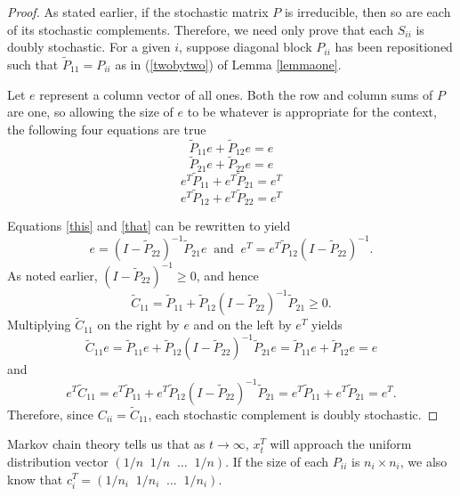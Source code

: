 \documentclass[final]{siamltex}
\begin{document}
\begin{proof}
As stated earlier, if the stochastic matrix $P$ is irreducible, then so are each of its stochastic complements. Therefore, we need only prove that each $S_{ii}$ is doubly stochastic. For a given $i$, suppose diagonal block $P_{ii}$ has been repositioned such that $\tilde{P}_{11}=P_{ii}$ as in  (\ref{twobytwo}) of Lemma \ref{lemmaone}.

Let $e$ represent a column vector of all ones. Both the row and column sums of $P$ are one, so allowing the size of $e$ to be whatever is appropriate for the context, the following four equations are true 
\begin{equation}
\tilde{P}_{11}e + \tilde{P}_{12}e = e 
\end{equation}
\begin{equation} \label{this}
\tilde{P}_{21}e + \tilde{P}_{22}e = e 
\end{equation}
\begin{equation}
e^{T}\tilde{P}_{11} + e^{T}\tilde{P}_{21} = e^{T} 
\end{equation}
\begin{equation} \label{that}
e^{T}\tilde{P}_{12} + e^{T}\tilde{P}_{22} = e^{T}
\end{equation}

Equations \ref{this} and \ref{that} can be rewritten to yield
$$
e = \left(I - \tilde{P}_{22} \right) ^{-1} \tilde{P}_{21}e \;\; \mbox{and} \;\; e^{T}=e^{T} \tilde{P}_{12} \left(I - \tilde{P}_{22} \right)^{-1}.
$$
As noted earlier, $(I - \tilde{P}_{22}) ^{-1} \ge 0$, and hence 
$$
\tilde{C}_{11}= \tilde{P}_{11}+\tilde{P}_{12} \left(I- \tilde{P}_{22}\right)^{-1}\tilde{P}_{21} \ge 0.
$$
Multiplying $\tilde{C}_{11}$ on the right by $e$ and on the left by $e^{T}$ yields
$$
\tilde{C}_{11}e= \tilde{P}_{11}e+\tilde{P}_{12} \left(I- \tilde{P}_{22}\right)^{-1}\tilde{P}_{21}e =
 \tilde{P}_{11}e+\tilde{P}_{12}e = e
$$ 
and
$$ 
e^{T}\tilde{C}_{11}= e^{T}\tilde{P}_{11}+e^{T}\tilde{P}_{12} \left(I- \tilde{P}_{22}\right)^{-1}\tilde{P}_{21} =
e^{T}\tilde{P}_{11}+e^{T} \tilde{P}_{21} = e^{T}.
$$
Therefore, since $C_{ii}=\tilde{C}_{11}$, each stochastic complement is doubly stochastic.
\end{proof}

Markov chain theory tells us that as $t \rightarrow \infty$, $x_{t}^{T}$ will approach the uniform distribution vector $(1/n \;\; 1/n \;\; \dots \;\; 1/n)$. If the size of each $P_{ii}$ is $n_{i} \times n_{i}$, we also know that $c_{i}^{T} =  (1/n_{i} \;\; 1/n_{i} \;\; \dots \;\; 1/n_{i})$.
\end{document}
